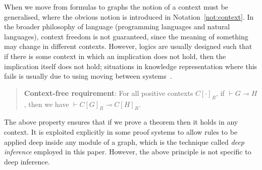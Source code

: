 \documentclass{lmcs} %
\newcommand{\coons}[2]{[#1]_{#2}}														%
\newcommand{\coonso}[1]{[\cdot]_{#1}}
\def\gC{C}
\theoremstyle{plain}
\begin{document}
When we move from formulas to graphs the notion of a context must be generalised, where the obvious notion is introduced in Notation~\ref{not:context}.
In the broader philosophy of language (programming languages and natural languages), context freedom is not guaranteed, since the meaning of something may change in different contexts. 
However, logics are usually designed such that if there is some context in which an implication does not hold, then the implication itself does not hold; situations in knowledge representation where this fails is usually due to using moving between systems~\cite{Gabbay1998}. 
\begin{quote}
	\textbf{Context-free requirement}: For all positive contexts $\gC\coonso{R}$, if $\vdash G \multimap H$,
		then we have $\vdash \gC\coons{ G }{R} \multimap \gC\coons{ H}{R}$.
\end{quote}
The above property ensures that if we prove a theorem then it holds in any context. It is exploited explicitly in some proof systems to allow rules to be applied deep inside any module of a graph, which is the technique called \textit{deep inference} employed in this paper. However, the above principle is not specific to deep inference.
\end{document}
